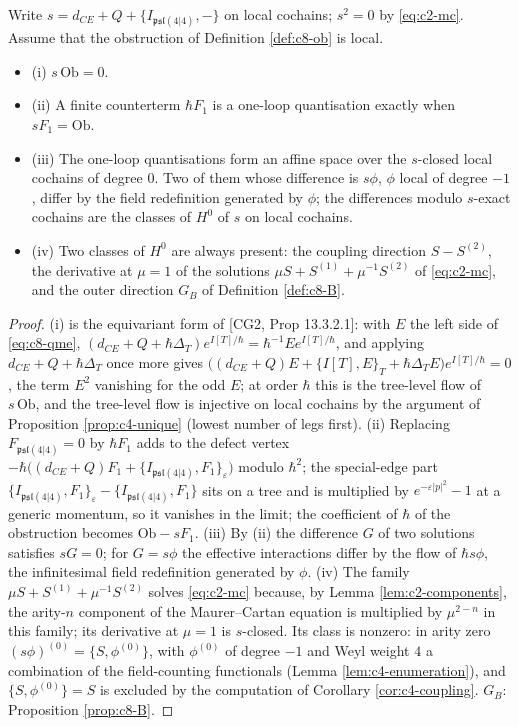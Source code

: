 \begin{theorem}
\label{thm:c8-obstruction}
Write $s=d_{CE}+Q+\{I_{\mathfrak{psl}(4|4)},-\}$ on local cochains; $s^2=0$ by \eqref{eq:c2-mc}. Assume that the obstruction of Definition \ref{def:c8-ob} is local.
\begin{itemize}
\item (i) $s\,\mathrm{Ob}=0$.
\item (ii) A finite counterterm $\hbar F_1$ is a one-loop quantisation exactly when $sF_1=\mathrm{Ob}$.
\item (iii) The one-loop quantisations form an affine space over the $s$-closed local cochains of degree $0$. Two of them whose difference is $s\phi$, $\phi$ local of degree $-1$, differ by the field redefinition generated by $\phi$; the differences modulo $s$-exact cochains are the classes of $H^0$ of $s$ on local cochains.
\item (iv) Two classes of $H^0$ are always present: the coupling direction $S-S^{(2)}$, the derivative at $\mu=1$ of the solutions $\mu S+S^{(1)}+\mu^{-1}S^{(2)}$ of \eqref{eq:c2-mc}, and the outer direction $G_B$ of Definition \ref{def:c8-B}.
\end{itemize}
\end{theorem}

\begin{proof}
(i) is the equivariant form of [CG2, Prop 13.3.2.1]: with $E$ the left side of \eqref{eq:c8-qme}, $(d_{CE}+Q+\hbar\Delta_T)e^{I[T]/\hbar}=\hbar^{-1}Ee^{I[T]/\hbar}$, and applying $d_{CE}+Q+\hbar\Delta_T$ once more gives $\big((d_{CE}+Q)E+\{I[T],E\}_T+\hbar\Delta_TE\big)e^{I[T]/\hbar}=0$, the term $E^2$ vanishing for the odd $E$; at order $\hbar$ this is the tree-level flow of $s\,\mathrm{Ob}$, and the tree-level flow is injective on local cochains by the argument of Proposition \ref{prop:c4-unique} (lowest number of legs first). (ii) Replacing $F_{\mathfrak{psl}(4|4)}=0$ by $\hbar F_1$ adds to the defect vertex $-\hbar\big((d_{CE}+Q)F_1+\{I_{\mathfrak{psl}(4|4)},F_1\}_\varepsilon\big)$ modulo $\hbar^2$; the special-edge part $\{I_{\mathfrak{psl}(4|4)},F_1\}_\varepsilon-\{I_{\mathfrak{psl}(4|4)},F_1\}$ sits on a tree and is multiplied by $e^{-\varepsilon|p|^2}-1$ at a generic momentum, so it vanishes in the limit; the coefficient of $\hbar$ of the obstruction becomes $\mathrm{Ob}-sF_1$. (iii) By (ii) the difference $G$ of two solutions satisfies $sG=0$; for $G=s\phi$ the effective interactions differ by the flow of $\hbar s\phi$, the infinitesimal field redefinition generated by $\phi$. (iv) The family $\mu S+S^{(1)}+\mu^{-1}S^{(2)}$ solves \eqref{eq:c2-mc} because, by Lemma \ref{lem:c2-components}, the arity-$n$ component of the Maurer--Cartan equation is multiplied by $\mu^{2-n}$ in this family; its derivative at $\mu=1$ is $s$-closed. Its class is nonzero: in arity zero $(s\phi)^{(0)}=\{S,\phi^{(0)}\}$, with $\phi^{(0)}$ of degree $-1$ and Weyl weight $4$ a combination of the field-counting functionals (Lemma \ref{lem:c4-enumeration}), and $\{S,\phi^{(0)}\}=S$ is excluded by the computation of Corollary \ref{cor:c4-coupling}. $G_B$: Proposition \ref{prop:c8-B}.
\end{proof}

